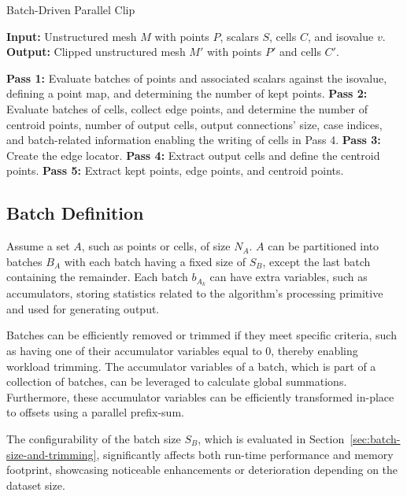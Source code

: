 \documentclass{egpubl}
\begin{document}
\begin{algorithm}
\caption{Batch-Driven Parallel Clip}
\label{alg:par-iso}
\raggedright
\textbf{Input:} Unstructured mesh $M$ with points $P$, scalars $S$, cells $C$, and isovalue $v$.\\
\textbf{Output:} Clipped unstructured mesh $M'$ with points $P'$ and cells $C'$.
\begin{algorithmic}[1]
    \State \textbf{Pass 1:} Evaluate batches of points and associated scalars against the isovalue, defining a point map, and determining the number of kept points.
    \State \textbf{Pass 2:} Evaluate batches of cells, collect edge points, and determine the number of centroid points, number of output cells, output connections' size, case indices, and batch-related information enabling the writing of cells in Pass 4.
    \State \textbf{Pass 3:} Create the edge locator.
    \State \textbf{Pass 4:} Extract output cells and define the centroid points.
    \State \textbf{Pass 5:} Extract kept points, edge points, and centroid points.
\end{algorithmic}
\end{algorithm}

\subsection{Batch Definition}

Assume a set $A$, such as points or cells, of size $N_A$. $A$ can be partitioned into batches $B_A$ with each batch having a fixed size of $S_B$, except the last batch containing the remainder. Each batch $b_{A_k}$ can have extra variables, such as accumulators, storing statistics related to the algorithm's processing primitive and used for generating output.

Batches can be efficiently removed or trimmed if they meet specific criteria, such as having one of their accumulator variables equal to $0$, thereby enabling workload trimming. The accumulator variables of a batch, which is part of a collection of batches, can be leveraged to calculate global summations. Furthermore, these accumulator variables can be efficiently transformed in-place to offsets using a parallel prefix-sum.

The configurability of the batch size $S_B$, which is evaluated in Section~\ref{sec:batch-size-and-trimming}, 
significantly affects both run-time performance and memory footprint, showcasing noticeable enhancements or deterioration depending on the dataset size.
\end{document}
